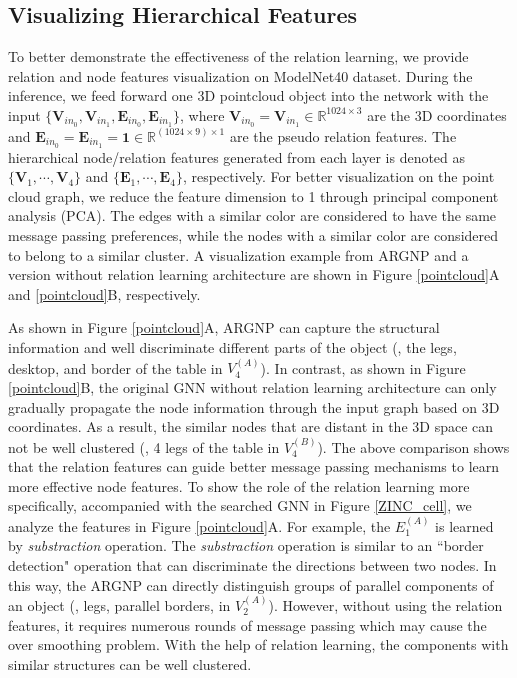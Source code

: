 \subsection{Visualizing Hierarchical Features}



To better demonstrate the effectiveness of the relation learning, we provide relation and node features visualization on ModelNet40 dataset. 
During the inference, we feed forward one 3D pointcloud object into the network with the input $\{\bm{V}_{in_0}, \bm{V}_{in_1}, \bm{E}_{in_0}, \bm{E}_{in_1}\}$, where $\bm{V}_{in_0} = \bm{V}_{in_1} \in \mathbb{R}^{1024 \times 3}$ are the 3D coordinates and $\bm{E}_{in_0} = \bm{E}_{in_1} = \bm{1} \in \mathbb{R}^{(1024 \times 9)\times 1}$ are the pseudo relation features. 
The hierarchical node/relation features generated from each layer is denoted as $\{\bm{V}_{1}, \cdots, \bm{V}_{4}\}$ and $\{\bm{E}_1, \cdots, \bm{E}_{4}\}$, respectively. 
For better visualization on the point cloud graph, we reduce the feature dimension to 1 through principal component analysis (PCA).
The edges with a similar color are considered to have the same message passing preferences, while the nodes with a similar color are considered to belong to a similar cluster. 
A visualization example from ARGNP and a version without relation learning architecture are shown in Figure \ref{pointcloud}A and \ref{pointcloud}B, respectively. 

As shown in Figure \ref{pointcloud}A, ARGNP can capture the structural information and well discriminate different parts of the object (\eg, the legs, desktop, and border of the table in $V_4^{(A)}$). 
In contrast, as shown in Figure \ref{pointcloud}B, the original GNN without relation learning architecture can only gradually propagate the node information through the input graph based on 3D coordinates. 
As a result, the similar nodes that are distant in the 3D space can not be well clustered (\eg, 4 legs of the table in $V_4^{(B)}$). 
The above comparison shows that the relation features can guide better message passing mechanisms to learn more effective node features. 
To show the role of the relation learning more specifically, accompanied with the searched GNN in Figure \ref{ZINC_cell}, we analyze the features in Figure \ref{pointcloud}A. 
For example, the $E_1^{(A)}$ is learned by \emph{substraction} operation. The \emph{substraction} operation is similar to an ``border detection" operation that can discriminate the directions between two nodes. 
In this way, the ARGNP can directly distinguish groups of parallel components of an object (\eg, legs, parallel borders, \etc in $V_2^{(A)}$). 
However, without using the relation features, it requires numerous rounds of message passing which may cause the over smoothing problem. 
With the help of relation learning, the components with similar structures can be well clustered. 








